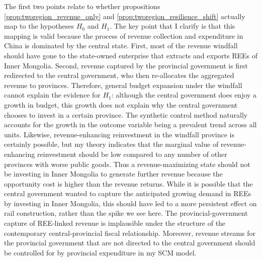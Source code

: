 \documentclass[12pt]{article}
\begin{document}
The first two points relate to whether propositions \ref{prop:tworegion_revenue_only} and \ref{prop:tworegion_resilience_shift} actually map to the hypotheses $H_0$ and $H_1$. The key point that I clarify is that this mapping is valid because the process of revenue collection and expenditure in China is dominated by the central state. First, most of the revenue windfall should have gone to the state-owned enterprise that extracts and exports REEs of Inner Mongolia. Second, revenue captured by the provincial government is first redirected to the central government, who then re-allocates the aggregated revenue to provinces. Therefore, general budget expansion under the windfall cannot explain the evidence for $H_1$: although the central government does enjoy a growth in budget, this growth does not explain why the central government chooses to invest in a certain province. The synthetic control method naturally accounts for the growth in the outcome variable being a prevalent trend across all units. Likewise, revenue-enhancing reinvestment in the windfall province is certainly possible, but my theory indicates that the marginal value of revenue-enhancing reinvestment should be low compared to any number of other provinces with worse public goods. Thus a revenue-maximizing state should not be investing in Inner Mongolia to generate further revenue because the opportunity cost is higher than the revenue returns. While it is possible that the central government wanted to capture the anticipated growing demand in REEs by investing in Inner Mongolia, this should have led to a more persistent effect on rail construction, rather than the spike we see here.
The provincial-government capture of REE-linked revenue is implausible under the structure of the contemporary central-provincial fiscal relationship.  Moreover, revenue streams for the provincial government that are not directed to the central government should be controlled for by provincial expenditure in my SCM model.


\newpage


\printbibliography
\end{document}
